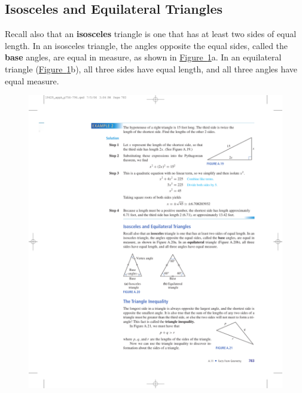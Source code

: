 \documentclass[10pt,]{book}
\newcommand{\terminology}[1]{\textbf{#1}}
\theoremstyle{plain}
\theoremstyle{definition}
\theoremstyle{definition}
\theoremstyle{definition}
\numberwithin{equation}{part}
\begin{document}
\subsection[{Isosceles and Equilateral Triangles}]{Isosceles and Equilateral Triangles}\label{subsection-52}
Recall also that an \terminology{isosceles} triangle is one that has at least two sides of equal length. In an isosceles triangle, the angles opposite the equal sides, called the \terminology{base} angles, are equal in measure, as shown in \hyperref[fig-isosceles-and-equilateral]{Figure~\ref{fig-isosceles-and-equilateral}}a. In an equilateral triangle (\hyperref[fig-isosceles-and-equilateral]{Figure~\ref{fig-isosceles-and-equilateral}}b), all three sides have equal length, and all three angles have equal measure. \leavevmode%
\begin{figure}
\centering
\includegraphics[width=0.55\linewidth]{images/fig-isosceles-and-equilateral}
\caption{\label{fig-isosceles-and-equilateral}}
\end{figure}
%
\typeout{************************************************}
\typeout{************************************************}
\end{document}
